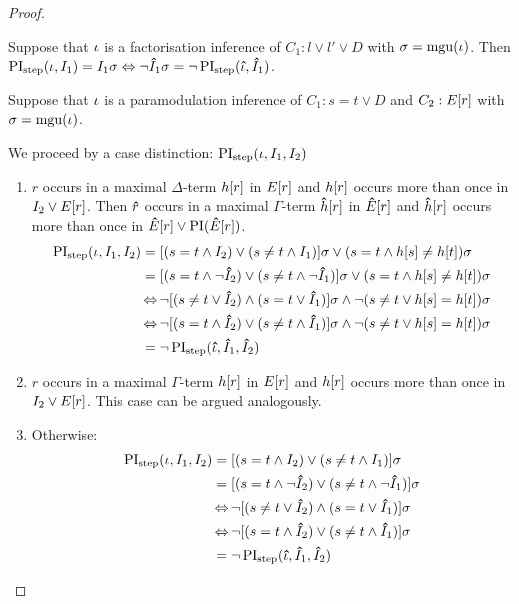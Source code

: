 \begin{proof}
\begin{indproof}
					Suppose that $\iota$ is a factorisation inference of $C_1: l \lor l' \lor D$
					with $\sigma = \operatorname{mgu}(\iota)$.
					Then $\operatorname{PI}_{\mathrm{step}}(\iota, I_1) = I_1\sigma \;{\operatorname{\Leftrightarrow}}\; \lnot \bm\hat{I}_1\sigma = \lnot \operatorname{PI}_{\mathrm{step}}(\bm\hat{\iota}, \bm\hat{I}_1)$.

					Suppose that $\iota$ is a paramodulation inference of $C_1: s=t \lor D$ and $C_2: E[r]$ 
					with $\sigma = \operatorname{mgu}(\iota)$.

					We proceed by a case distinction:
					$\operatorname{PI}_{\mathrm{step}}(\iota, I_1, I_2)$

					\begin{enumerate}
						\item $r$ occurs in a maximal $\Delta$-term $h[r]$ in $E[r]$ and $h[r]$ occurs more than once in $I_2 \lor E[r]$.
							Then $\bm\hat{r}$ occurs in a maximal $\Gamma$-term $\bm\hat{h}[r]$ in $\bm\hat{E}[r]$ and $\bm\hat{h}[r]$ occurs more than once in $\bm\hat{E}[r] \lor \operatorname{PI}(\bm\hat{E}[r])$.
							\begin{align*}
								\operatorname{PI}_{\mathrm{step}}(\iota, I_1, I_2) &= [ ( s=t \land I_2 ) \lor (s\neq t \land I_1) ]\sigma \lor (s=t \land h[s] \neq h[t])\sigma\\
														&= [ ( s=t \land \lnot \bm\hat{I}_2 ) \lor (s\neq t \land \lnot \bm\hat{I}_1) ]\sigma \lor (s=t \land h[s] \neq h[t])\sigma\\
														&\operatorname{\Leftrightarrow} \lnot [ ( s\neq t \lor \bm\hat{I}_2 ) \land (s= t \lor \bm\hat{I}_1) ]\sigma \land \lnot (s\neq t \lor h[s] = h[t])\sigma\\
														&\operatorname{\Leftrightarrow} \lnot [ ( s = t \land \bm\hat{I}_2 ) \lor (s\neq t \land \bm\hat{I}_1) ]\sigma \land \lnot (s\neq t \lor h[s] = h[t])\sigma\\
													 &= \lnot \operatorname{PI}_{\mathrm{step}}(\bm\hat{\iota}, \bm\hat{I}_1, \bm\hat{I}_2)
							\end{align*}

						\item $r$ occurs in a maximal $\Gamma$-term $h[r]$ in $E[r]$ and $h[r]$ occurs more than once in $I_2 \lor E[r]$.
							This case can be argued analogously.
						\item Otherwise:
							\begin{align*}
								\operatorname{PI}_{\mathrm{step}}(\iota, I_1, I_2) &= [ ( s=t \land I_2 ) \lor (s\neq t \land I_1) ]\sigma \\
														&= [ ( s=t \land \lnot \bm\hat{I}_2 ) \lor (s\neq t \land \lnot \bm\hat{I}_1) ]\sigma \\
														&\operatorname{\Leftrightarrow} \lnot [ ( s\neq t \lor \bm\hat{I}_2 ) \land (s=t \lor \bm\hat{I}_1) ]\sigma \\
														&\operatorname{\Leftrightarrow} \lnot [ ( s=t \land \bm\hat{I}_2 ) \lor (s\neq t \land \bm\hat{I}_1) ]\sigma \\
													 &= \lnot \operatorname{PI}_{\mathrm{step}}(\bm\hat{\iota}, \bm\hat{I}_1, \bm\hat{I}_2)
								\qedhere
							\end{align*}
					\end{enumerate}



\end{indproof}
\end{proof}
